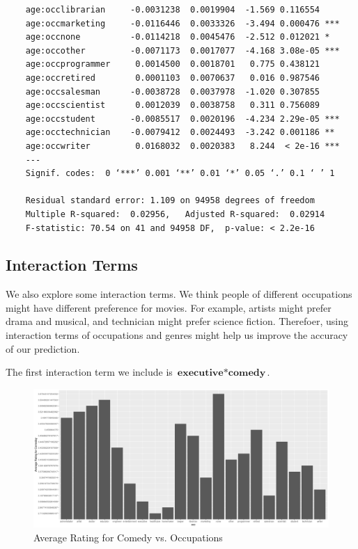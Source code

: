 \documentclass[11pt]{article}
\begin{document}
\begin{verbatim}
    age:occlibrarian     -0.0031238  0.0019904  -1.569 0.116554    
    age:occmarketing     -0.0116446  0.0033326  -3.494 0.000476 ***
    age:occnone          -0.0114218  0.0045476  -2.512 0.012021 *  
    age:occother         -0.0071173  0.0017077  -4.168 3.08e-05 ***
    age:occprogrammer     0.0014500  0.0018701   0.775 0.438121    
    age:occretired        0.0001103  0.0070637   0.016 0.987546    
    age:occsalesman      -0.0038728  0.0037978  -1.020 0.307855    
    age:occscientist      0.0012039  0.0038758   0.311 0.756089    
    age:occstudent       -0.0085517  0.0020196  -4.234 2.29e-05 ***
    age:occtechnician    -0.0079412  0.0024493  -3.242 0.001186 ** 
    age:occwriter         0.0168032  0.0020383   8.244  < 2e-16 ***
    ---
    Signif. codes:  0 ‘***’ 0.001 ‘**’ 0.01 ‘*’ 0.05 ‘.’ 0.1 ‘ ’ 1
    
    Residual standard error: 1.109 on 94958 degrees of freedom
    Multiple R-squared:  0.02956,   Adjusted R-squared:  0.02914 
    F-statistic: 70.54 on 41 and 94958 DF,  p-value: < 2.2e-16
\end{verbatim}

\subsection{Interaction Terms}
We also explore some interaction terms. We think people of 
different occupations might have different preference for movies.
For example, artists might prefer drama and musical, and technician
might prefer science fiction. Therefoer, using interaction terms 
of occupations and genres might help us improve the accuracy of 
our prediction.

\clearpage
The first interaction term we include is $\textbf{executive} * \textbf{comedy}$.
\begin{figure}[ht!]
\begin{center}
\includegraphics[width=\textwidth]{comedy_occ.png}
\caption{Average Rating for Comedy vs. Occupations}
\end{center}
\end{figure}
\end{document}
